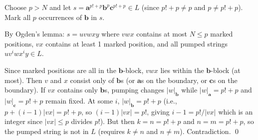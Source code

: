 \begin{enumerate}[{9.}1. ]
Choose $p > N$ and let $s = \pmb{a}^{p!+p}\pmb{b}^p\pmb{c}^{p!+p} \in L$ (since $p!+p \neq p$ and $p \neq p!+p$). Mark all $p$ occurrences of $\pmb{b}$ in $s$.

By Ogden's lemma: $s = uvwxy$ where $vwx$ contains at most $N \leq p$ marked positions, $vx$ contains at least 1 marked position, and all pumped strings $uv^i wx^i y \in L$.

Since marked positions are all in the $\pmb{b}$-block, $vwx$ lies within the $\pmb{b}$-block (at most). Then $v$ and $x$ consist only of $\pmb{b}$s (or $\pmb{a}$s on the boundary, or $\pmb{c}$s on the boundary). If $vx$ contains only $\pmb{b}$s, pumping changes $|w|_{\pmb{b}}$ while $|w|_{\pmb{a}} = p!+p$ and $|w|_{\pmb{c}} = p!+p$ remain fixed. At some $i$, $|w|_{\pmb{b}} = p!+p$ (i.e., $p + (i-1)|vx| = p!+p$, so $(i-1)|vx| = p!$, giving $i-1 = p!/|vx|$ which is an integer since $|vx| \leq p$ divides $p!$). But then $k = n = p!+p$ and $n = m = p!+p$, so the pumped string is not in $L$ (requires $k\neq n$ and $n\neq m$). Contradiction. \qed

\end{enumerate}
